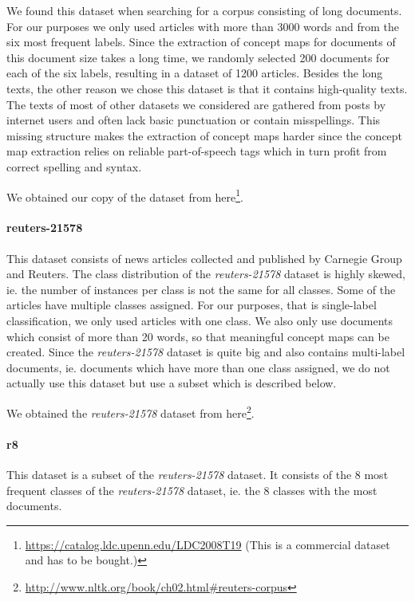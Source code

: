 We found this dataset when searching for a corpus consisting of long documents. 
For our purposes we only used articles with more than 3000 words and from the six most frequent labels.
Since the extraction of concept maps for documents of this document size takes a long time, we randomly selected 200 documents for each of the six labels, resulting in a dataset of 1200 articles.
Besides the long texts, the other reason we chose this dataset is that it contains high-quality texts.
The texts of most of other datasets we considered are gathered from posts by internet users and often lack basic punctuation or contain misspellings.
This missing structure makes the extraction of concept maps harder since the concept map extraction relies on reliable part-of-speech tags which in turn profit from correct spelling and syntax. 

We obtained our copy of the dataset from here\footnote{\url{https://catalog.ldc.upenn.edu/LDC2008T19} (This is a commercial dataset and has to be bought.)}.

\paragraph{reuters-21578}
This dataset consists of news articles collected and published by Carnegie Group and Reuters.
 The class distribution of the \textit{reuters-21578} dataset is highly skewed, ie. the number of instances per class is not the same for all classes.
 Some of the articles have multiple classes assigned. For our purposes, that is single-label classification, we only used articles with one class.
 We also only use documents which consist of more than 20 words, so that meaningful concept maps can be created.
Since the \textit{reuters-21578} dataset is quite big and also contains multi-label documents, ie. documents which have more than one class assigned, we do not actually use this dataset but use a subset which is described below.

We obtained the \textit{reuters-21578} dataset from here\footnote{\url{http://www.nltk.org/book/ch02.html\#reuters-corpus}}.

\paragraph{r8}
This dataset is a subset of the \textit{reuters-21578} dataset.
It consists of the 8 most frequent classes of the \textit{reuters-21578} dataset, ie. the 8 classes with the most documents.

